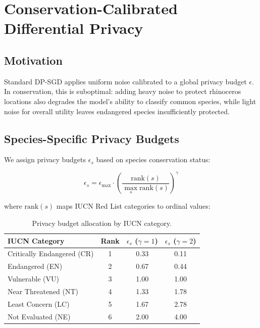 \section{Conservation-Calibrated Differential Privacy}

\label{sec:privacy}

\subsection{Motivation}

Standard DP-SGD \citep{abadi2016deep} applies uniform noise calibrated to a global privacy budget $\epsilon$.
In conservation, this is suboptimal: adding heavy noise to protect rhinoceros locations also degrades the model's ability to classify common species, while light noise for overall utility leaves endangered species insufficiently protected.

\subsection{Species-Specific Privacy Budgets}

We assign privacy budgets $\epsilon_s$ based on species conservation status:

\begin{equation}
    \epsilon_s = \epsilon_{\max} \cdot \left(\frac{\text{rank}(s)}{\max_s \text{rank}(s)}\right)^\gamma
\end{equation}

\noindent where $\text{rank}(s)$ maps IUCN Red List categories to ordinal values:

\begin{table}[H]
\centering
\caption{Privacy budget allocation by IUCN category.}
\label{tab:privacy_budgets}
\begin{tabular}{@{}lccc@{}}
\toprule
\textbf{IUCN Category} & \textbf{Rank} & $\epsilon_s$ ($\gamma=1$) & $\epsilon_s$ ($\gamma=2$) \\
\midrule
Critically Endangered (CR) & 1 & 0.33 & 0.11 \\
Endangered (EN) & 2 & 0.67 & 0.44 \\
Vulnerable (VU) & 3 & 1.00 & 1.00 \\
Near Threatened (NT) & 4 & 1.33 & 1.78 \\
Least Concern (LC) & 5 & 1.67 & 2.78 \\
Not Evaluated (NE) & 6 & 2.00 & 4.00 \\
\bottomrule
\end{tabular}
\end{table}

